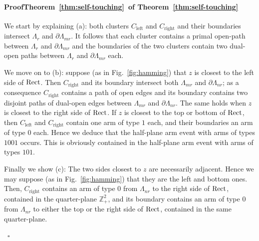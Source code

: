 \documentclass[a4paper,oneside,11pt]{article}
\numberwithin{equation}{section}
\numberwithin{equation}{section}
\numberwithin{equation}{section}
\newenvironment{proof}[1][\relax]%
  {\paragraph{Proof\ifx#1\relax\else~of #1\fi}}%
  {~\hfill$\square$\par\bigskip}
\newcommand{\bbZ}{\mathbb{Z}}
\newcommand{\La}{\Lambda}
\begin{document}
\begin{proof}[Theorem~\ref{thm:self-touching}]
{    	We start by explaining (a): both clusters $C_{\text{left}}$ and $C_{\text{right}}$ and their boundaries intersect $\La_r$ and $\partial \La_{mr}$. 
    	It follows that each cluster contains a primal open-path between $\La_r$ and $\partial \La_{mr}$
    	and the boundaries of the two clusters contain two dual-open paths between   $\La_r$ and $\partial \La_{mr}$ each. 
    
    	We move on to (b): suppose (as in Fig.~\ref{fig:hamming}) that $z$ is closest to the left side of ${\rm Rect}$. 
    	Then $C_{\text{right}}$ and its boundary intersect both $\La_{mr}$ and $\partial \La_{nr}$; 
    	as a consequence $C_{\text{right}}$ contains a path of open edges and its boundary contains two disjoint paths 
		of dual-open edges between $\La_{mr}$ and $\partial \La_{nr}$.
    	The same holds when $z$ is closest to the right side of ${\rm Rect}$.
    	If $z$ is closest to the top or bottom of ${\rm Rect}$, then $C_{\text{left}}$ and $C_{\text{right}}$ contain one arm of type $1$ each, 
		and their boundaries an arm of type $0$ each. Hence we deduce that the half-plane arm event with arms of types $1001$ occurs. 
		This is obviously contained in the half-plane arm event with arms of types $101$. 
    
    	Finally we show (c): 
    	The two sides closest to $z$ are necessarily adjacent. Hence we may suppose (as in Fig.~\ref{fig:hamming}) that they are the left and bottom ones. 
    	Then, $C_{\text{right}}$ contains an arm of type $0$ from $\La_{nr}$ to the right side of ${\rm Rect}$, contained in the quarter-plane $\bbZ_+^2$, 
    	and its boundary contains an arm of type $0$ from $\La_{nr}$ to either the top or the right side of ${\rm Rect}$, contained in the same quarter-plane. 
    
}
\end{proof}
\end{document}

